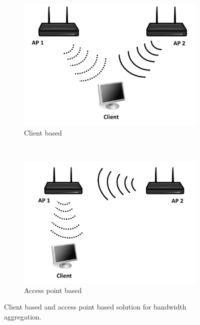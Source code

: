 
\begin{figure}[tb]
    \centering
    \begin{subfigure}[t]{0.5\textwidth}
        \centering
        \includegraphics[width=.8\textwidth]{aggregation/background/figures/aggr_client_sw}
        \caption{Client based}
				\label{fig:aggregation:background:aggrclient}
    \end{subfigure}%
    ~
    \begin{subfigure}[t]{0.5\textwidth}
        \centering
        \includegraphics[width=.8\textwidth]{aggregation/background/figures/aggr_ap_sw}
        \caption{Access point based}
				\label{fig:aggregation:background:aggrap}
    \end{subfigure}
    \caption{Client based and access point based solution for bandwidth aggregation.}
		\label{fig:aggregation:background:aggr}
\end{figure}

